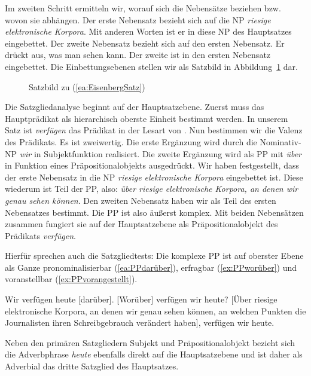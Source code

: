 Im zweiten Schritt ermitteln wir, worauf sich die Nebensätze beziehen bzw. wovon sie abhängen. Der erste Nebensatz bezieht sich auf die NP \textit{riesige elektronische Korpora}. Mit anderen Worten ist er in diese NP des Hauptsatzes eingebettet. Der zweite Nebensatz bezieht sich auf den ersten Nebensatz. Er drückt aus, was man sehen kann. Der zweite ist in den ersten Nebensatz eingebettet. Die Einbettungsebenen stellen wir als Satzbild in Abbildung~\ref{Abb:Satzbild_Korpora} dar.

\begin{figure}
    \centering
    
    \caption{Satzbild zu (\ref{ea:EisenbergSatz})}
    \label{Abb:Satzbild_Korpora}
\end{figure}

Die Satzgliedanalyse beginnt auf der Hauptsatzebene. Zuerst muss das Hauptprädikat als hierarchisch oberste Einheit bestimmt werden. In unserem Satz ist \textit{verfügen} das Prädikat in der Lesart von . Nun bestimmen wir die Valenz des Prädikats. Es ist zweiwertig. Die erste Ergänzung wird durch die Nominativ-NP \textit{wir} in Subjektfunktion realisiert. Die zweite Ergänzung wird als PP mit \textit{über} in Funktion eines Präpositionalobjekts ausgedrückt. Wir haben festgestellt, dass der erste Nebensatz in die NP \textit{riesige elektronische Korpora} eingebettet ist. Diese wiederum ist Teil der PP, also: \textit{über riesige elektronische Korpora, an denen wir genau sehen können}. Den zweiten Nebensatz haben wir als Teil des ersten Nebensatzes bestimmt. Die PP ist also äußerst komplex. Mit beiden Nebensätzen zusammen fungiert sie auf der Hauptsatzebene als Präpositionalobjekt des Prädikats \textit{verfügen}. 

Hierfür sprechen auch die Satzgliedtests: Die komplexe PP ist auf oberster Ebene als Ganze pronominalisierbar (\ref{ea:PPdarüber}), erfragbar (\ref{ex:PPworüber}) und voranstellbar (\ref{ex:PPvorangestellt}).

\ea \label{ea:SGTests}
\ea \label{ea:PPdarüber} Wir verfügen heute [darüber].
\ex \label{ex:PPworüber} [Worüber] verfügen wir heute?
\ex \label{ex:PPvorangestellt} [Über riesige elektronische Korpora, an denen wir genau sehen können, an welchen Punkten die Journalisten ihren Schreibgebrauch verändert haben], verfügen wir heute.
\z 
\z 

Neben den primären Satzgliedern Subjekt und Präpositionalobjekt bezieht sich die Adverbphrase \textit{heute} ebenfalls direkt auf die Hauptsatzebene und ist daher als Adverbial das dritte Satzglied des Hauptsatzes. 

